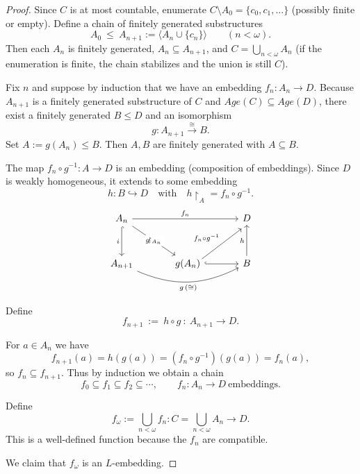 \begin{proof}
    Since $C$ is at most countable, enumerate $C\setminus A_0=\{c_0,c_1,\dots\}$ (possibly finite or empty).
    Define a chain of finitely generated substructures
    \[
        A_0\ \le\ A_{n+1}:=\langle A_n\cup\{c_n\}\rangle\qquad(n<\omega).
    \]
    Then each $A_n$ is finitely generated, $A_n\subseteq A_{n+1}$, and $C=\bigcup_{n<\omega}A_n$
    (if the enumeration is finite, the chain stabilizes and the union is still $C$).


    Fix $n$ and suppose by induction that we have an embedding $f_n\colon A_n\to D$.
    Because $A_{n+1}$ is a finitely generated substructure of $C$ and $Age(C)\subseteq Age(D)$,
    there exist a finitely generated $B\le D$ and an isomorphism
    \[
        g\colon A_{n+1}\xrightarrow{\ \cong\ } B.
    \]
    Set $A:=g(A_n)\le B$. Then $A,B$ are finitely generated with $A\subseteq B$.


    The map $f_n\circ g^{-1}\colon A\to D$ is an embedding (composition of embeddings).
    Since $D$ is weakly homogeneous, it extends to some embedding
    \[
        h\colon B\hookrightarrow D\quad\text{with}\quad h\!\upharpoonright_A=f_n\circ g^{-1}.
    \]
    \[
        \begin{tikzcd}[row sep=3em, column sep=3.5em, ampersand replacement=\&]
            A_n \arrow[rr,"f_n"] \arrow[d,hook,"i"']
            \arrow[dr,"g\!\upharpoonright_{A_n}" description] \& \& D  \\
            A_{n+1}
            \arrow[rr, bend right=25, "g \, (\cong)"']
            \&
            g(A_n) \arrow[r,hook] \arrow[ur,"f_n \circ g^{-1}", shift right=2] \&
            B \arrow[u,"h"]
        \end{tikzcd}
    \]

    Define
    \[
        f_{n+1}\ :=\ h\circ g\ \colon\ A_{n+1}\longrightarrow D.
    \]



    For $a\in A_n$ we have
    \[
        f_{n+1}(a)=h(g(a))=(f_n\circ g^{-1})(g(a))=f_n(a),
    \]
    so $f_n\subseteq f_{n+1}$. Thus by induction we obtain a chain
    \[
        f_0\subseteq f_1\subseteq f_2\subseteq\cdots,\qquad f_n\colon A_n\to D\ \text{embeddings}.
    \]


    Define $$f_\omega:=\bigcup_{n<\omega} f_n\colon C=\bigcup_{n<\omega}A_n\to D.$$ This is a well-defined function because the $f_n$ are compatible.

    We claim that $f_\omega$ is an $L$-embedding.


\end{proof}
